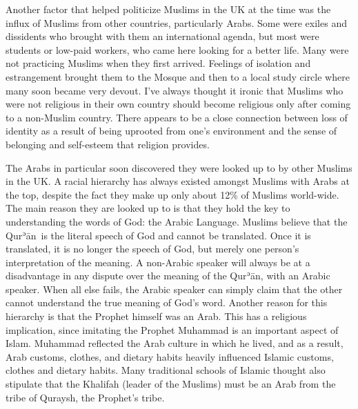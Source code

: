 \documentclass[12pt]{memoir}
\def\´{ʾ} %
\def \Quran{Qur\-\´ān} %
\begin{document}
Another factor that helped politicize Muslims in the UK at the time
was the influx of Muslims from other countries, particularly Arabs.
Some were exiles and dissidents who brought with them an international agenda,
but most were students or low-paid workers,
who came here looking for a better life.
Many were not practicing Muslims when they first arrived.
Feelings of isolation and estrangement brought them to the Mosque
and then to a local study circle where many soon became very devout.
I’ve always thought it ironic that Muslims
who were not religious in their own country
should become religious only after coming to a non-Muslim country.
There appears to be a close connection between loss of identity
as a result of being uprooted from one’s environment
and the sense of belonging and self-esteem that religion provides.

The Arabs in particular soon discovered
they were looked up to by other Muslims in the UK.
A racial hierarchy has always existed amongst Muslims with Arabs at the top,
despite the fact they make up only about 12\% of Muslims world-wide.
The main reason they are looked up to is that they hold the key
to understanding the words of God: the Arabic Language.
Muslims believe that the \Quran\ is the literal speech of God
and cannot be translated.
Once it is translated, it is no longer the speech of God,
but merely one person’s interpretation of the meaning.
A non-Arabic speaker will always be at a disadvantage in any dispute
over the meaning of the \Quran, with an Arabic speaker.
When all else fails, the Arabic speaker can simply claim
that the other cannot understand the true meaning of God’s word.
Another reason for this hierarchy is that the Prophet himself was an Arab.
This has a religious implication,
since imitating the Prophet Muhammad is an important aspect of Islam.
Muhammad reflected the Arab culture in which he lived, and as a result,
Arab customs, clothes, and dietary habits heavily influenced Islamic customs,
clothes and dietary habits.
Many traditional schools of Islamic thought also stipulate
that the Khalifah (leader of the Muslims)
must be an Arab from the tribe of Quraysh, the Prophet’s tribe.
\end{document}
